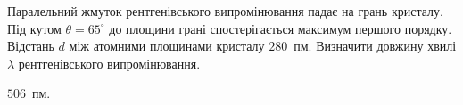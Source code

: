 \begin{problem}%
    Паралельний жмуток рентгенівського випромінювання падає на грань кристалу. Під кутом $ \theta = 65^\circ $ до площини грані спостерігається максимум першого порядку. Відстань $ d $ між атомними площинами кристалу $ 280 $~пм. Визначити довжину хвилі $ \lambda $ рентгенівського випромінювання.
    \begin{solution}
        $506$~пм.
    \end{solution}
\end{problem}



